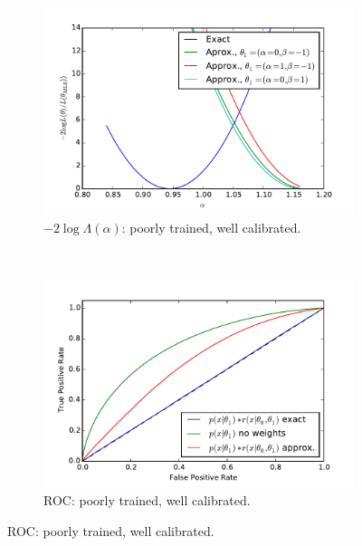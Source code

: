\documentclass[12pt]{article}
\numberwithin{equation}{section}
\theoremstyle{plain}
\begin{document}
\begin{figure}
    \centering
    \begin{subfigure}[t]{0.4\textwidth}
        \centering
        \includegraphics[width=\textwidth]{figures/likelihood_comp_0.pdf}
        \caption{$-2\log \Lambda(\alpha)$: poorly trained, well calibrated. }
        \label{fig:6a}
    \end{subfigure}
    ~
    \begin{subfigure}[t]{0.4\textwidth}
        \centering
        \includegraphics[width=\textwidth]{figures/ROC_comp0.pdf}
        \caption{ROC: poorly trained, well calibrated. }
        \label{fig:6b}
    \end{subfigure}


\end{figure}
\end{document}
